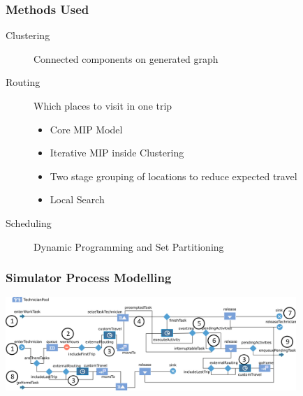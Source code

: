 \begin{frame}
\frametitle{Methods Used}
\begin{description}
\item[Clustering] Connected components on generated graph
\item[Routing] Which places to visit in one trip
\begin{itemize}
\item Core MIP Model
\item Iterative MIP inside Clustering
\item Two stage grouping of locations to reduce expected travel
\item Local Search
\end{itemize}
\item[Scheduling] Dynamic Programming and Set Partitioning
\end{description}
\end{frame}





\begin{frame}
\frametitle{Simulator Process Modelling}
\includegraphics[width=11cm]{imagesfieldservice/processmodelling}
\end{frame}


